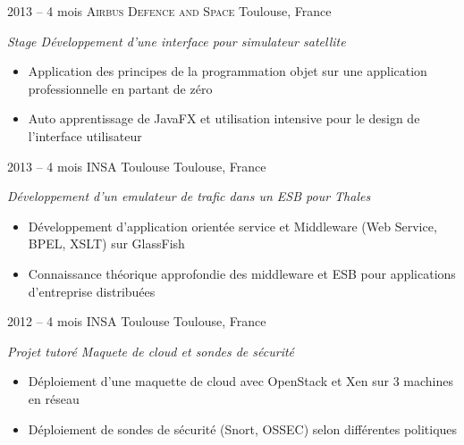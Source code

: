 \documentclass[]{friggeri-cv} %
\begin{document}
\begin{entrylist}
\entry
{2013 -- 4 mois}
{\textsc{Airbus Defence and Space}}
{Toulouse, France}
{\emph{Stage Développement d'une interface pour simulateur satellite}
\begin{itemize}
\item Application des principes de la programmation objet sur une application professionnelle en partant de zéro
\item Auto apprentissage de JavaFX et utilisation intensive pour le design de l'interface utilisateur
\end{itemize}
}
\entry
{2013 -- 4 mois}
{INSA Toulouse}
{Toulouse, France}
{\emph{Développement d'un emulateur de trafic dans un ESB pour Thales}
\begin{itemize}
\item Développement d'application orientée service et Middleware (Web Service, BPEL, XSLT) sur GlassFish
\item Connaissance théorique approfondie des middleware et ESB pour applications d'entreprise distribuées
\end{itemize}}
\entry
{2012 -- 4 mois}
{INSA Toulouse}
{Toulouse, France}
{\emph{Projet tutoré Maquete de cloud et sondes de sécurité}
\begin{itemize}
\item Déploiement d'une maquette de cloud avec OpenStack et Xen sur 3 machines en réseau
\item Déploiement de sondes de sécurité (Snort, OSSEC) selon différentes politiques
\end{itemize}}


\end{entrylist}
\end{document}
